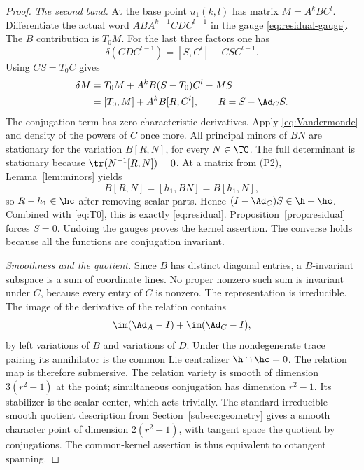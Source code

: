 \begin{proof}
\smallskip\noindent\emph{The second band.}
At the base point $u_1(k,l)$ has matrix $M=A^kBC^l$.
Differentiate the actual word $AB A^{k-1}CD C^{l-1}$ in the gauge
\eqref{eq:residual-gauge}. The $B$ contribution is $T_0M$.
For the last three factors one has
\[
 \delta(CDC^{l-1})=[S,C^l]-CSC^{l-1}.
\]
Using $CS=T_0C$ gives
\begin{align}
 \delta M
 &=T_0M+A^kB(S-T_0)C^l-MS\notag\\
 &=[T_0,M]+A^kB[R,C^l],\qquad R=S-\Ad_CS.\label{eq:second-variation}
\end{align}
The conjugation term has zero characteristic derivatives. Apply
\eqref{eq:Vandermonde} and density of the powers of $C$ once more.
All principal minors of $BN$ are stationary for the variation $B[R,N]$,
for every $N\in\TC$. The full determinant is stationary because
$\tr(N^{-1}[R,N])=0$. At a matrix from (P2),
Lemma~\ref{lem:minors} yields
\[
 B[R,N]=[h_1,BN]=B[h_1,N],
\]
so $R-h_1\in\hc$ after removing scalar parts. Hence
$(I-\Ad_C)S\in\h+\hc$. Combined with \eqref{eq:T0}, this is exactly
\eqref{eq:residual}. Proposition~\ref{prop:residual} forces $S=0$.
Undoing the gauges proves the kernel assertion. The converse holds because
all the functions are conjugation invariant.

\smallskip\noindent\emph{Smoothness and the quotient.}
Since $B$ has distinct diagonal entries, a $B$-invariant subspace is a
sum of coordinate lines. No proper nonzero such sum is invariant under
$C$, because every entry of $C$ is nonzero. The representation is
irreducible. The image of the derivative of the relation contains
\[
 \im(\Ad_A-I)+\im(\Ad_C-I),
\]
by left variations of $B$ and variations of $D$. Under the nondegenerate
trace pairing its annihilator is the common Lie centralizer
$\h\cap\hc=0$. The relation map is therefore submersive. The relation
variety is smooth of dimension $3(r^2-1)$ at the point; simultaneous
conjugation has dimension $r^2-1$. Its stabilizer is the scalar center,
which acts trivially. The standard irreducible smooth quotient description
from Section~\ref{subsec:geometry} gives a smooth character point of
dimension $2(r^2-1)$, with tangent space the quotient by conjugations.
The common-kernel assertion is thus equivalent to cotangent spanning.
\end{proof}

